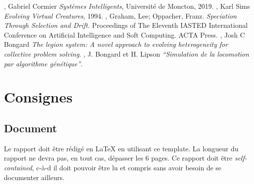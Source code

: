 \documentclass[journal, a4paper]{IEEEtran}
\begin{document}
%
%
\begin{thebibliography}{99}
	 , Gabriel Cormier \textit{Systèmes Intelligents}, Université de Moncton, 2019.
	 , Karl Sims \textit{Evolving Virtual Creatures}, 1994.
	 , Graham, Lee; Oppacher, Franz. \textit{
	Speciation Through Selection and Drift. } Proceedings of The Eleventh IASTED International Conference on Artificial Intelligence and Soft Computing. ACTA Press.
	 , Josh C Bongard \textit{The legion
	system: A novel approach to evolving heterogeneity for collective problem solving}.
	 , J. Bongard et H. Lipson \textit{“Simulation de la locomotion par algorithme génétique”}.
\end{thebibliography}


\newpage

\appendices
\section{Consignes}
\subsection*{Document}
	Le rapport doit être rédigé en \LaTeX{} en utilisant ce template.
	La longueur du rapport ne devra pas, en tout cas, dépasser les 6 pages.
	Ce rapport doit être \emph{self-contained}, c-à-d il doit pouvoir être lu et compris sans avoir besoin de se documenter ailleurs.



\end{document}
